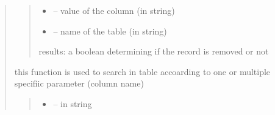 \documentclass[letterpaper,10pt,english]{sphinxmanual}
\begin{document}
\begin{quote}
\begin{savenotes}
\begin{fulllineitems}
\begin{savenotes}
\begin{fulllineitems}
\begin{quote}
\begin{description}
\begin{itemize}
\item {} 
\sphinxAtStartPar
{} – value of the column (in string)

\item {} 
\sphinxAtStartPar
{} – name of the table (in string)

\end{itemize}

\sphinxAtStartPar
results: a boolean determining if the record is removed or not

\end{description}\end{quote}

\end{fulllineitems}\end{savenotes}


\begin{savenotes}\begin{fulllineitems}
\label{\detokenize{setting/database:oxin.database.dataBase.report_last}}
\pysigstartsignatures
{}
\pysigstopsignatures
\end{fulllineitems}\end{savenotes}


\begin{savenotes}\begin{fulllineitems}
\label{\detokenize{setting/database:oxin.database.dataBase.search}}
\pysigstartsignatures
{}
\pysigstopsignatures
\sphinxAtStartPar
this function is used to search in table accoarding to one or multiple specifiic parameter (column name)
\begin{quote}\begin{description}
\begin{itemize}
\item {} 
\sphinxAtStartPar
{} – in string


\end{itemize}
\end{description}
\end{quote}
\end{fulllineitems}
\end{savenotes}
\end{fulllineitems}
\end{savenotes}
\end{quote}
\end{document}
